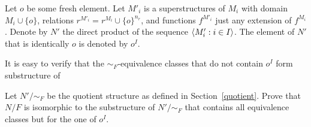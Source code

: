 \documentclass[creche.tex]{subfiles}
\begin{document}
\begin{exercise}\label{ex_o}
Let \emph{$o$\/} be some fresh element. Let \emph{$M'_i$\/} is a superstructures of $M_i$ with domain $M_i\cup\{o\}$, relations $r^{M'_i}=r^{M_i}\cup\{o\}^{n_r}$, and functions $f^{M'_i}$ just any extension of $f^{M_i}$. Denote by $N'$ the direct product of the sequence $\langle M'_i:i\in I\rangle$. The element of $N'$ that is identically $o$ is denoted by $o^I$.
 
It is easy to verify that the $\mathord{\sim_F}$-equivalence classes that do not contain $o^I$ form substructure of 

Let $N'/\mathord{\sim_F}$ be the quotient structure as defined in Section~\ref{quotient}. Prove that $N/F$ is isomorphic to the substructure of $N'/\mathord{\sim_F}$ that contains all equivalence classes but for the one of $o^I$.\QED
\end{exercise}
\end{document}
